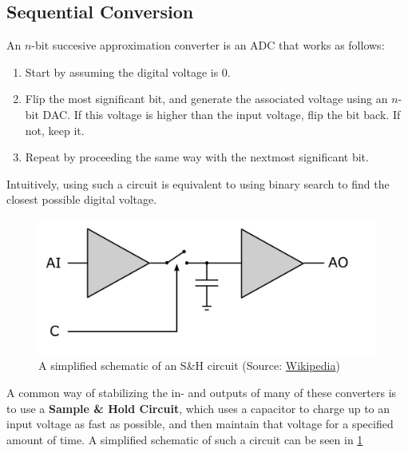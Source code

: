 \documentclass{report}
\newcommand{\tbf}{\textbf}
\newcommand*{\newpar}{\par\vspace{\baselineskip}\noindent} %
\begin{document}
\subsection{Sequential Conversion}
An $n$-bit succesive approximation converter is an ADC that works as follows:
\begin{enumerate}
 \item Start by assuming the digital voltage is $0$.
 \item Flip the most significant bit, and generate the associated voltage using an $n$-bit DAC. If this voltage is higher than the input voltage, flip the bit back. If not, keep it.
 \item Repeat by proceeding the same way with the nextmost significant bit.
\end{enumerate}
Intuitively, using such a circuit is equivalent to using binary search to find the closest possible digital voltage.
\begin{figure}[h!]
\centering
\includegraphics[scale=0.25]{figures/SH}
\caption{A simplified schematic of an S\&H circuit (Source: \href{https://en.wikipedia.org/wiki/File:Sample-hold-circuit.svg}{Wikipedia})}
\label{fig:SH}
\end{figure}
\newpar
A common way of stabilizing the in- and outputs of many of these converters is to use a \tbf{Sample \& Hold Circuit}, which uses a capacitor to charge up to an input voltage as fast as possible, and then maintain that voltage for a specified amount of time. A simplified schematic of such a circuit can be seen in \ref{fig:SH}
%
\clearpage
\end{document}
